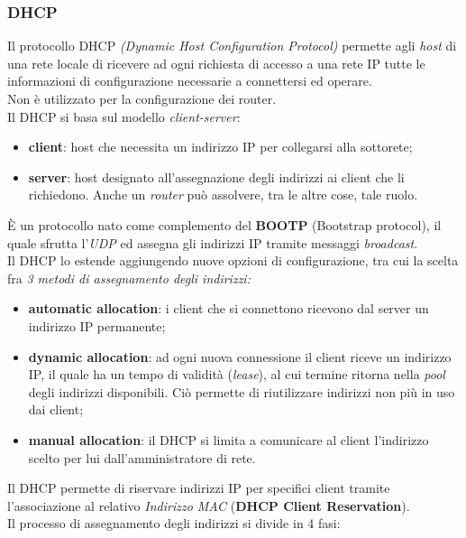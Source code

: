 \documentclass[a4paper,11pt]{article}
\def\italic#1{\textit{#1}}
\begin{document}
\subsubsection{DHCP}
Il protocollo DHCP \textit{(Dynamic Host Configuration Protocol)} permette agli \italic{host} di una rete locale di ricevere ad ogni richiesta di accesso a una rete IP tutte le informazioni di configurazione necessarie a connettersi ed operare.
\\Non è utilizzato per la configurazione dei router.
\\ Il DHCP si basa sul modello \italic{client-server}:
\begin{itemize}
	\item \textbf{client}:  host che necessita un indirizzo IP per collegarsi alla sottorete;
	\item \textbf{server}:  host designato all'assegnazione degli indirizzi ai client che li richiedono. Anche un \italic{router} può assolvere, tra le altre cose, tale ruolo.
\end{itemize}
È un protocollo nato come complemento del \textbf{BOOTP} (Bootstrap protocol), il quale sfrutta l'\textit{UDP} ed assegna gli indirizzi IP tramite messaggi \italic{broadcast}.
\\Il DHCP lo estende aggiungendo nuove opzioni di configurazione, tra cui la scelta fra \textit{3 metodi di assegnamento degli indirizzi:}
\begin{itemize}
	\item \textbf{automatic allocation}: i client che si connettono ricevono dal server un indirizzo IP permanente;
	\item \textbf{dynamic allocation}: ad ogni nuova connessione il client riceve un indirizzo IP, il quale ha un tempo di validità (\italic{lease}), al cui termine ritorna nella \italic{pool} degli indirizzi disponibili. Ciò permette di riutilizzare indirizzi non più in uso dai client;
	\item \textbf{manual allocation}: il DHCP si limita a comunicare al client l'indirizzo scelto per lui dall'amministratore di rete.
\end{itemize}
Il DHCP permette di riservare indirizzi IP per specifici client tramite l'associazione al relativo \textit{Indirizzo MAC} (\textbf{DHCP Client Reservation}).
\\Il processo di assegnamento degli indirizzi si divide in 4 fasi:
\end{document}

